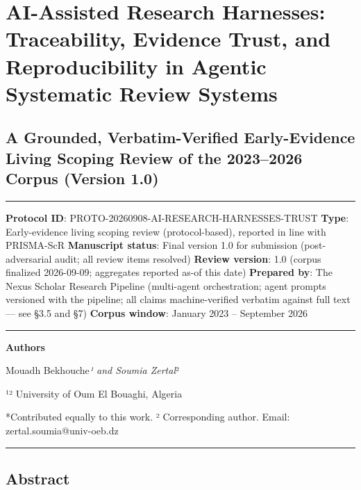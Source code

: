 \documentclass[11pt]{article}
\begin{document}
\section{AI-Assisted Research Harnesses: Traceability, Evidence Trust,
and Reproducibility in Agentic Systematic Review
Systems}\label{ai-assisted-research-harnesses-traceability-evidence-trust-and-reproducibility-in-agentic-systematic-review-systems}

\subsection{A Grounded, Verbatim-Verified Early-Evidence Living Scoping
Review of the 2023--2026 Corpus (Version
1.0)}\label{a-grounded-verbatim-verified-early-evidence-living-scoping-review-of-the-20232026-corpus-version-1.0}

\begin{center}\rule{0.5\linewidth}{0.5pt}\end{center}

\textbf{Protocol ID}: PROTO-20260908-AI-RESEARCH-HARNESSES-TRUST
\textbf{Type}: Early-evidence living scoping review (protocol-based),
reported in line with PRISMA-ScR \textbf{Manuscript status}: Final
version 1.0 for submission (post-adversarial audit; all review items
resolved) \textbf{Review version}: 1.0 (corpus finalized 2026-09-09;
aggregates reported as-of this date) \textbf{Prepared by}: The Nexus
Scholar Research Pipeline (multi-agent orchestration; agent prompts
versioned with the pipeline; all claims machine-verified verbatim
against full text --- see §3.5 and §7) \textbf{Corpus window}: January
2023 -- September 2026

\begin{center}\rule{0.5\linewidth}{0.5pt}\end{center}

\textbf{Authors}

Mouadh Bekhouche\emph{¹ and Soumia Zertal}²

¹² University of Oum El Bouaghi, Algeria

*Contributed equally to this work. ² Corresponding author. Email:
zertal.soumia@univ-oeb.dz

\begin{center}\rule{0.5\linewidth}{0.5pt}\end{center}

\subsection{Abstract}\label{abstract}
\end{document}

